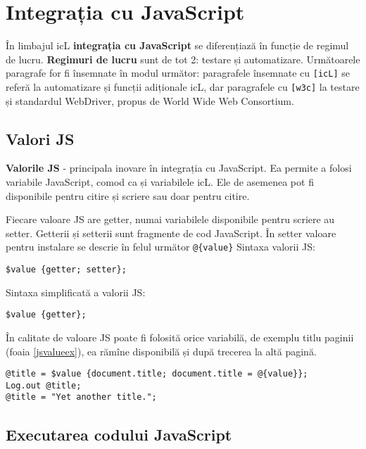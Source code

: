 \section{Integrația cu JavaScript}

În limbajul icL {\bf integrația cu JavaScript} se diferențiază în funcție de regimul de lucru. {\bf Regimuri de lucru} sunt de tot 2: testare și automatizare. Următoarele paragrafe for fi însemnate în modul următor: paragrafele însemnate cu \texttt{[icL]} se referă la automatizare și funcții adiționale icL, dar paragrafele cu \texttt{[w3c]} la testare și standardul WebDriver, propus de World Wide Web Consortium.

\subsection{Valori JS}

{\bf Valorile JS} - principala inovare în integrația cu JavaScript. Ea permite a folosi variabile JavaScript, comod ca și variabilele icL. Ele de asemenea pot fi disponibile pentru citire și scriere sau doar pentru citire.

Fiecare valoare JS are getter, numai variabilele disponibile pentru scriere au setter. Getterii și setterii sunt fragmente de cod JavaScript. În setter valoare pentru instalare se descrie în felul următor \texttt{@\{value\}} Sintaxa valorii JS:
\begin{verbatim}
$value {getter; setter};
\end{verbatim}

Sintaxa simplificată a valorii JS:
\begin{verbatim}
$value {getter};
\end{verbatim}

În calitate de valoare JS poate fi folosită orice variabilă, de exemplu titlu paginii (foaia \ref{jsvalueex}), ea rămîne disponibilă și după trecerea la altă pagină.

\begin{sourcecode}
\label{jsvalueex}
\begin{verbatim}
@title = $value {document.title; document.title = @{value}};
Log.out @title;
@title = "Yet another title.";
\end{verbatim}
\end{sourcecode}

\subsection{Executarea codului JavaScript}

